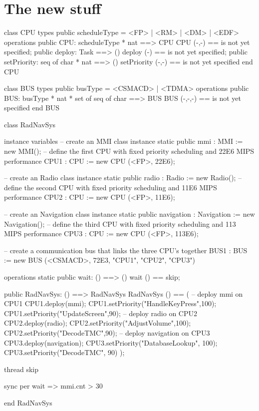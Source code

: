 %
%

\section{The new stuff}

\begin{vdm_al}
class CPU
types public scheduleType = <FP> | <RM> | <DM> | <EDF>
operations
public CPU: scheduleType * nat ==> CPU
CPU (-,-) == is not yet specified;
public deploy: Task ==> ()
deploy (-) == is not yet specified;
public setPriority: seq of char * nat ==> ()
setPriority (-,-) == is not yet specified
end CPU

class BUS
types public busType = <CSMACD> | <TDMA>
operations
public BUS: busType * nat * set of seq of char ==> BUS
BUS (-,-,-) == is not yet specified
end BUS

class RadNavSys

instance variables
  -- create an MMI class instance
  static public mmi : MMI := new MMI();
  -- define the first CPU with fixed priority scheduling and 22E6 MIPS performance
  CPU1 : CPU := new CPU (<FP>, 22E6);

  -- create an Radio class instance
  static public radio : Radio := new Radio();
  -- define the second CPU with fixed priority scheduling and 11E6 MIPS performance
  CPU2 : CPU := new CPU (<FP>, 11E6);

  -- create an Navigation class instance
  static public navigation : Navigation := new Navigation();
  -- define the third CPU with fixed priority scheduling and 113 MIPS performance
  CPU3 : CPU := new CPU (<FP>, 113E6); 

  -- create a communication bus that links the three CPU's together
  BUS1 : BUS := new BUS (<CSMACD>, 72E3, {"CPU1", "CPU2", "CPU3"})

operations
  static public wait: () ==> ()
  wait () == skip;

  public RadNavSys: () ==> RadNavSys
  RadNavSys () ==
    ( -- deploy mmi on CPU1
      CPU1.deploy(mmi);
      CPU1.setPriority("HandleKeyPress",100);
      CPU1.setPriority("UpdateScreen",90);
      -- deploy radio on CPU2
      CPU2.deploy(radio);
      CPU2.setPriority("AdjustVolume",100);
      CPU2.setPriority("DecodeTMC",90);
      -- deploy navigation on CPU3
      CPU3.deploy(navigation);
      CPU3.setPriority("DatabaseLookup", 100);
      CPU3.setPriority("DecodeTMC", 90) );

  thread
    skip

  sync
    per wait => mmi.cnt > 30

end RadNavSys
\end{vdm_al}


